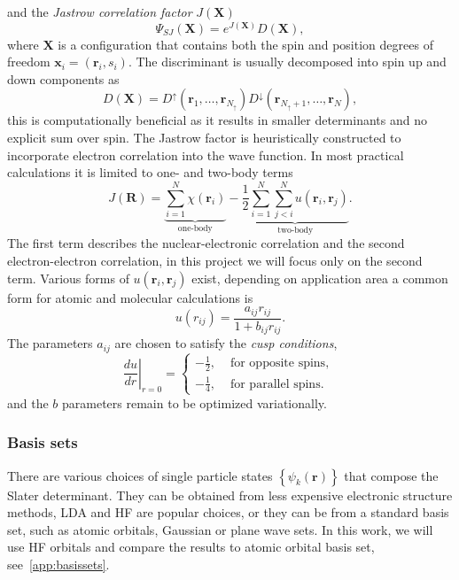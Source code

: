 \documentclass[final,3p,times,twocolumn]{elsarticle}
\begin{document}
	and the \emph{Jastrow correlation factor} $J(\mathbf{X})$
	\begin{equation}
		\Psi_{SJ}(\mathbf{X})=e^{J(\mathbf{X})} D(\mathbf{X}),
	\end{equation}
	where $\mathbf{X}$ is a configuration that contains both the spin and position degrees of freedom $\mathbf{x}_i = (\mathbf{r}_i, s_i)$. The discriminant is usually decomposed into spin up and down components as
	\begin{equation}
		D(\mathbf{X}) = D^{\uparrow}\left(\mathbf{r}_{1}, \ldots, \mathbf{r}_{N_{\uparrow}}\right) D^{\downarrow}\left(\mathbf{r}_{N_{\uparrow}+1}, \ldots, \mathbf{r}_{N}\right),
	\end{equation}
	this is computationally beneficial as it results in smaller determinants and no explicit sum over spin.
	The Jastrow factor is heuristically constructed to incorporate electron correlation into the wave function. In most practical calculations it is limited to one- and two-body terms~\cite{foulkes2001quantum}
	\begin{equation}
		J(\mathbf{R})=
		\underbrace{\sum_{i=1}^{N} \chi\left(\mathbf{r}_{i}\right)}_{\text{one-body}}
		-
		\underbrace{\frac{1}{2} \sum_{i=1}^{N} \sum_{j<i}^{N} u\left(\mathbf{r}_{i}, \mathbf{r}_{j}\right)}_{\text{two-body}}.
	\end{equation}
	The first term describes the nuclear-electronic correlation and the second electron-electron correlation, in this project we will focus only on the second term. 
	Various forms of $u(\mathbf{r}_{i}, \mathbf{r}_{j})$ exist, depending on application area a common form for atomic and molecular calculations is
	\begin{equation}
		u(r_{ij})=\frac{a_{ij} r_{ij}}{1+b_{ij} r_{ij}}.
	\end{equation}
	The parameters $a_{ij}$ are chosen to satisfy the \emph{cusp conditions},  
	\begin{equation}
		\left.\frac{d u}{d r}\right|_{r=0}=\left\{\begin{array}{cl}-\frac{1}{2}, & \text { for opposite spins, } \\ -\frac{1}{4}, & \text { for parallel spins. }\end{array}\right.
	\end{equation}
	and the $b$ parameters remain to be optimized variationally. 
	
	\subsubsection{Basis sets}
	There are various choices of single particle states $\left\{\psi_k(\mathbf{r})\right\}$ that compose the Slater determinant. They can be obtained from less expensive electronic structure methods, LDA and HF are popular choices, or they can be from a standard basis set, such as atomic orbitals, Gaussian or plane wave sets. In this work, we will use HF orbitals and compare the results to atomic orbital basis set, see~\ref{app:basissets}.
	
\end{document}
